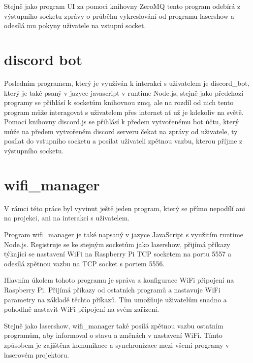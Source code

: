 \documentclass{template/socthesis}
\begin{document}


Stejně jako program UI za pomoci knihovny ZeroMQ tento program odebírá z výstupního socketu zprávy o průběhu vykreslování od programu lasershow a odesílá mu pokyny uživatele na vstupní socket.



\section{discord bot}

Posledním programem, který je využíván k interakci s uživatelem je discord\_bot, který je také psaný v jazyce javascript v runtime Node.js, stejně jako předchozí programy se přihlásí k socketům knihovnou zmq, ale na rozdíl od nich tento program může interagovat s uživatelem přes internet ať už je kdekoliv na světě.
Pomocí knihovny discord.js se přihlásí k předem vytvořenému bot účtu, který může na předem vytvořeném discord serveru čekat na zprávy od uživatele, ty posílat do vstupního socketu a posílat uživateli zpětnou vazbu, kterou příjme z výstupního socketu.

\section{wifi\_manager}

V rámci této práce byl vyvinut ještě jeden program, který se přímo nepodílí ani na projekci, ani na interakci s uživatelem.

Program wifi\_manager je také napsaný v jazyce JavaScript s využitím runtime Node.js. Registruje se ke stejným socketům jako lasershow, přijímá příkazy týkající se nastavení WiFi na Raspberry Pi TCP socketem na portu 5557 a odesílá zpětnou vazbu na TCP socket s portem 5556.


Hlavním úkolem tohoto programu je správa a konfigurace WiFi připojení na Raspberry Pi. Přijímá příkazy od ostatních programů a nastavuje WiFi parametry na základě těchto příkazů. Tím umožňuje uživatelům snadno a pohodlně nastavit WiFi připojení na svém zařízení.

Stejně jako lasershow, wifi\_manager také posílá zpětnou vazbu ostatním programům, aby informoval o stavu a změnách v nastavení WiFi. Tímto způsobem je zajištěna komunikace a synchronizace mezi všemi programy v laserovém projektoru.
\end{document}
